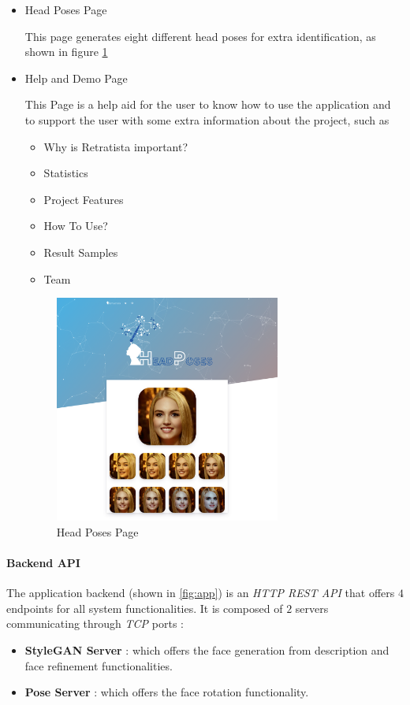 \begin{itemize}
    \item Head Poses Page
    
    This page generates eight different head poses for extra identification, as shown in figure \ref{fig:poses}
    
    \item Help and Demo Page 
    
    This Page is a help aid for the user to know how to use the application and to support the user with some extra information about the project, such as
    \begin{itemize}
        \item Why is Retratista important?
        \item Statistics
        \item Project Features
        \item How To Use?
        \item Result Samples
        \item Team
    \end{itemize}
    
    \begin{figure}[H]
        \centering
        \includegraphics[width=0.7\textwidth]{images/website/poses.png}
        \caption{Head Poses Page}
        \label{fig:poses}
    \end{figure}
    
\end{itemize}

\paragraph{Backend API}
The application backend (shown in \ref{fig:app}) is an \emph{HTTP REST API} that offers $4$ endpoints for all system functionalities. It is composed of $2$ servers communicating through \emph{TCP} ports :
\begin{itemize}
    \item \textbf{StyleGAN Server} : which offers the face generation from description and face refinement functionalities.
    \item \textbf{Pose Server} : which offers the face rotation functionality.
\end{itemize}

